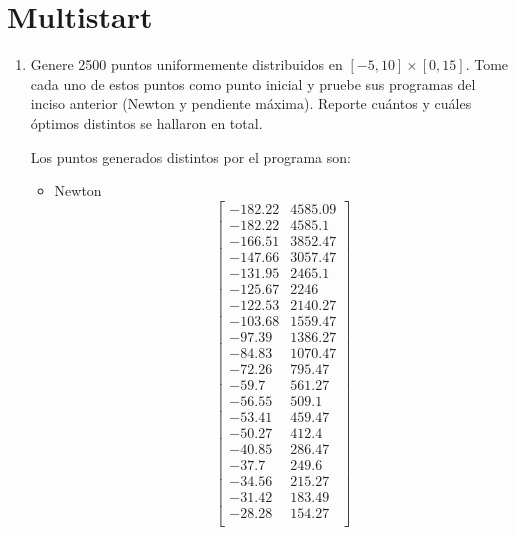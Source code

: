 \documentclass[12pt]{article}
\begin{document}
\section{Multistart}

\begin{enumerate}
    \item Genere 2500 puntos uniformemente distribuidos en $[-5, 10] \times [0, 15]$. Tome cada uno de estos puntos como punto inicial y pruebe sus programas del inciso anterior (Newton y pendiente máxima). Reporte cuántos y cuáles óptimos distintos se hallaron en total.
    
    Los puntos generados distintos por el programa son:
    \begin{itemize}
        \item Newton
        \[\begin{bmatrix}
            -182.22          &         4585.09 \\
            -182.22          &          4585.1\\
            -166.51          &         3852.47\\
            -147.66          &         3057.47\\
            -131.95          &          2465.1\\
            -125.67          &            2246\\
            -122.53          &         2140.27\\
            -103.68          &         1559.47\\
             -97.39          &         1386.27\\
             -84.83          &         1070.47\\
             -72.26          &          795.47\\
              -59.7          &          561.27\\
             -56.55          &           509.1\\
             -53.41          &          459.47\\
             -50.27          &           412.4\\
             -40.85          &          286.47\\
              -37.7          &           249.6\\
             -34.56          &          215.27\\
             -31.42          &          183.49\\
             -28.28          &          154.27\\

\end{bmatrix}\]
\end{itemize}
\end{enumerate}
\end{document}
